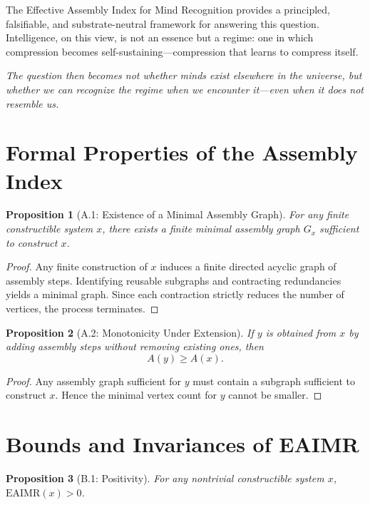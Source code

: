 \documentclass[11pt,letterpaper]{article}
\newtheorem{proposition}{Proposition}
\begin{document}
The Effective Assembly Index for Mind Recognition provides a principled, falsifiable, and substrate-neutral framework for answering this question. Intelligence, on this view, is not an essence but a regime: one in which compression becomes self-sustaining—compression that learns to compress itself.

\textit{The question then becomes not whether minds exist elsewhere in the universe, but whether we can recognize the regime when we encounter it—even when it does not resemble us.}

\printbibliography

\appendix

\section{Formal Properties of the Assembly Index}

\begin{proposition}[A.1: Existence of a Minimal Assembly Graph]
For any finite constructible system $x$, there exists a finite minimal assembly graph $G_x$ sufficient to construct $x$.
\end{proposition}

\begin{proof}
Any finite construction of $x$ induces a finite directed acyclic graph of assembly steps. Identifying reusable subgraphs and contracting redundancies yields a minimal graph. Since each contraction strictly reduces the number of vertices, the process terminates.
\end{proof}

\begin{proposition}[A.2: Monotonicity Under Extension]
If $y$ is obtained from $x$ by adding assembly steps without removing existing ones, then
\[
A(y) \geq A(x).
\]
\end{proposition}

\begin{proof}
Any assembly graph sufficient for $y$ must contain a subgraph sufficient to construct $x$. Hence the minimal vertex count for $y$ cannot be smaller.
\end{proof}

\section{Bounds and Invariances of EAIMR}

\begin{proposition}[B.1: Positivity]
For any nontrivial constructible system $x$, $\mathrm{EAIMR}(x) > 0$.
\end{proposition}
\end{document}
